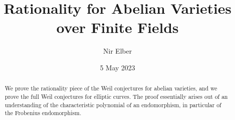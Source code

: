 \documentclass{amsart}
\title{Rationality for Abelian Varieties over Finite Fields}
\author{Nir Elber}
\date{5 May 2023}
\begin{document}
\begin{abstract}
	We prove the rationality piece of the Weil conjectures for abelian varieties, and we prove the full Weil conjectures for elliptic curves. The proof essentially arises out of an understanding of the characteristic polynomial of an endomorphism, in particular of the Frobenius endomorphism.
\end{abstract}


\maketitle

\setcounter{tocdepth}{2}
\tableofcontents
\end{document}
